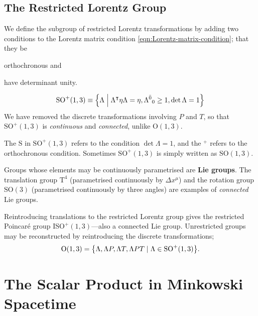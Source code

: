 \subsection{The Restricted Lorentz Group}

We define the subgroup of restricted Lorentz transformations by adding two conditions to the Lorentz matrix condition \eqref{eqn:Lorentz-matrix-condition}; that they be
\begin{enumerate*}[label=\arabic*)]
    \item orthochronous and
    \item have determinant unity.
\end{enumerate*}
\begin{align}
    \mathrm{SO}^+(1,3) \equiv \qty{\Lambda \;\middle|\; \Lambda^\intercal\eta\Lambda = \eta,
    \Lambda^{\bar0}{}_0 \ge 1, \det\Lambda = 1}
    \label{eqn:def-restricted-Lorentz-group}
\end{align}
We have removed the discrete transformations involving $ P$ and $ T$, so that $\mathrm{SO}^+(1,3)$ is \emph{continuous} and \emph{connected}, unlike $\mathrm{O}(1,3)$.

\begin{note}[Notation]
    The $\mathrm{S}$ in $\mathrm{SO}^+(1,3)$ refers to the condition $\det\Lambda = 1$, and the $^+$ refers to the orthochronous condition.
    Sometimes $\mathrm{SO}^+(1,3)$ is simply written as $\mathrm{SO}(1,3)$.
\end{note}

Groups whose elements may be continuously parametrised are \textbf{Lie groups}.
The translation group $\mathrm{T}^4$ (parametrised continuously by $\Delta x^\mu$) and the rotation group $\mathrm{SO}(3)$ (parametrised continuously by three angles) are examples of \emph{connected} Lie groups.

Reintroducing translations to the restricted Lorentz group gives the restricted Poincaré group $\mathrm{ISO}^+(1,3)$---also a connected Lie group.
Unrestricted groups may be reconstructed by reintroducing the discrete transformations;
\begin{align}
    \mathrm{O}(1,3) = \qty{\Lambda, \Lambda P, \Lambda T, \Lambda PT \mid \Lambda \in \mathrm{SO}^+(1,3)}
.\end{align}






\section{The Scalar Product in Minkowski Spacetime}






